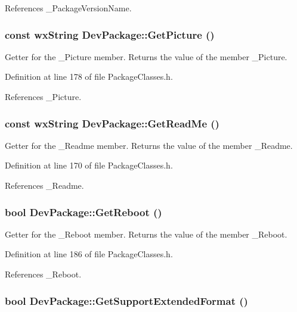 References \_\-Package\-Version\-Name.
\subsubsection{\setlength{\rightskip}{0pt plus 5cm}const wx\-String Dev\-Package::Get\-Picture ()\hspace{0.3cm}{\tt  [inline]}}\label{class_dev_package_df3c0c08f87d9b452edc4679b2bd0c3a}


Getter for the \_\-Picture member. Returns the value of the member \_\-Picture. 

Definition at line 178 of file Package\-Classes.h.

References \_\-Picture.
\subsubsection{\setlength{\rightskip}{0pt plus 5cm}const wx\-String Dev\-Package::Get\-Read\-Me ()\hspace{0.3cm}{\tt  [inline]}}\label{class_dev_package_2d337b84165d59171164577681d1e865}


Getter for the \_\-Readme member. Returns the value of the member \_\-Readme. 

Definition at line 170 of file Package\-Classes.h.

References \_\-Readme.
\subsubsection{\setlength{\rightskip}{0pt plus 5cm}bool Dev\-Package::Get\-Reboot ()\hspace{0.3cm}{\tt  [inline]}}\label{class_dev_package_776aa06294ed2d2a758c3f25d63de31a}


Getter for the \_\-Reboot member. Returns the value of the member \_\-Reboot. 

Definition at line 186 of file Package\-Classes.h.

References \_\-Reboot.
\subsubsection{\setlength{\rightskip}{0pt plus 5cm}bool Dev\-Package::Get\-Support\-Extended\-Format ()\hspace{0.3cm}{\tt  [inline]}}\label{class_dev_package_94fceb52ff6ab92f8af7b85f2c079a80}


